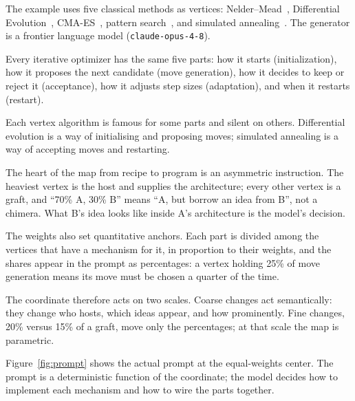 \documentclass[11pt]{article}
\begin{document}
The example uses five classical methods as vertices:
Nelder--Mead~\cite{neldermead1965}, Differential
Evolution~\cite{stornprice1997}, CMA-ES~\cite{hansen2001}, pattern
search~\cite{hookejeeves1961}, and simulated
annealing~\cite{kirkpatrick1983}. The generator is a frontier language
model (\texttt{claude-opus-4-8}).

Every iterative optimizer has the same five parts: how it starts
(initialization), how it proposes the next candidate (move generation), how
it decides to keep or reject it (acceptance), how it adjusts step sizes
(adaptation), and when it restarts (restart).

Each vertex algorithm is famous for some parts and silent on others.
Differential evolution is a way of initialising and proposing moves;
simulated annealing is a way of accepting moves and restarting.

The heart of the map from recipe to program is an asymmetric instruction.
The heaviest vertex is the host and supplies the architecture; every other
vertex is a graft, and ``70\% A, 30\% B'' means ``A, but borrow an idea
from B'', not a chimera. What B's idea looks like inside A's architecture
is the model's decision.

The weights also set quantitative anchors. Each part is divided among the
vertices that have a mechanism for it, in proportion to their weights, and
the shares appear in the prompt as percentages: a vertex holding 25\% of
move generation means its move must be chosen a quarter of the time.

The coordinate therefore acts on two scales. Coarse changes act
semantically: they change who hosts, which ideas appear, and how
prominently. Fine changes, 20\% versus 15\% of a graft, move only the
percentages; at that scale the map is parametric.

Figure~\ref{fig:prompt} shows the actual prompt at the equal-weights
center. The prompt is a deterministic function of the coordinate; the model
decides how to implement each mechanism and how to wire the parts together.
\end{document}
